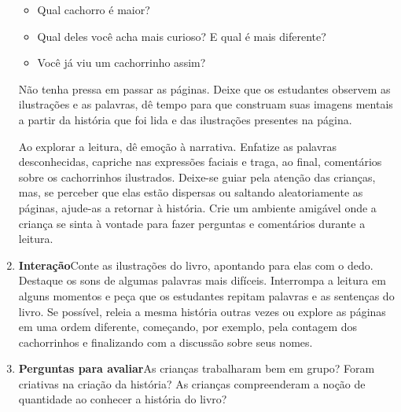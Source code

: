 \documentclass[11pt]{extarticle}
\begin{document}
\begin{enumerate}
\begin{itemize}
\item Qual cachorro é maior?
\item Qual deles você acha mais curioso? E qual é mais diferente?
\item Você já viu um cachorrinho assim?
\end{itemize}

Não tenha pressa em passar as páginas. Deixe que os estudantes 
observem as ilustrações e as palavras, dê tempo para que construam suas imagens 
mentais a partir da história que foi lida e das ilustrações presentes na página. 

Ao explorar a leitura, dê emoção 
à narrativa. Enfatize as palavras desconhecidas,
capriche nas expressões faciais e traga, ao final, comentários sobre os cachorrinhos ilustrados.
Deixe-se guiar pela atenção das crianças, mas, se perceber que 
elas estão dispersas ou saltando aleatoriamente as páginas, ajude-as 
a retornar à história. Crie um ambiente amigável onde a criança 
se sinta à vontade para fazer perguntas e comentários durante a leitura.

\item \textbf{Interação}\quad Conte as ilustrações 
do livro, apontando para elas com o dedo. Destaque os sons de algumas 
palavras mais difíceis. Interrompa a leitura em alguns momentos e peça que 
os estudantes repitam palavras e as sentenças do livro. Se possível, 
releia a mesma história outras vezes ou explore as páginas em uma ordem 
diferente, começando, por exemplo, pela contagem dos cachorrinhos e finalizando com a discussão sobre seus nomes. 



\item \textbf{Perguntas para avaliar}\quad As crianças trabalharam bem em grupo? Foram criativas na criação da história? As crianças compreenderam a noção de quantidade ao conhecer a história do livro?
\end{enumerate}
\end{document}
